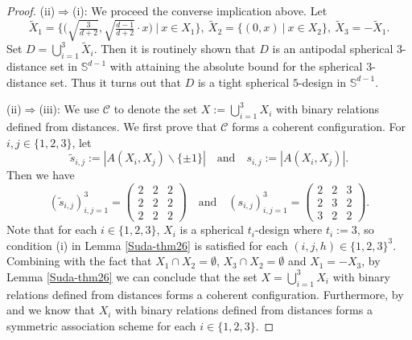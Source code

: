 \documentclass[11pt]{article}
\theoremstyle{definition}
\theoremstyle{remark}
\begin{document}
\begin{proof}
(ii)$\Rightarrow$(i): We proceed the converse implication above. 
Let 
\begin{equation*}
\widetilde{X}_1=\bigg\{\Big(\sqrt{\tfrac{3}{d+2}},\sqrt{\tfrac{d-1}{d+2}}\cdot x\Big)\ \Big|\  x\in X_1\bigg\},\  \widetilde{X}_2=\bigg\{(0,x) \ \Big|\  x\in X_2\bigg\},\ \widetilde{X}_3=-\widetilde{X}_1.
\end{equation*}
Set $D=\bigcup_{i=1}^3 \widetilde{X}_i$.
Then it is routinely shown that $D$ is an antipodal spherical $3$-distance set in $\mathbb{S}^{d-1}$ with attaining the absolute bound for the spherical $3$-distance set. 
Thus it turns out that $D$ is a tight spherical $5$-design in $\mathbb{S}^{d-1}$. 


(ii)$\Rightarrow$(iii): We use $\mathcal{C}$ to denote the set $X:=\bigcup_{i=1}^3 X_i$ with binary relations defined from distances. We first prove that $\mathcal{C}$ forms a coherent configuration. 
For $i,j\in\{1,2,3\}$, let 
\begin{equation*}
\widetilde{s}_{i,j}:=|A(X_i,X_j)\backslash\{\pm 1\}|	\quad\text{and}\quad {s}_{i,j}:=|A(X_i,X_j)|.
\end{equation*}
Then we have
\begin{equation*}
(\widetilde{s}_{i,j})_{i,j=1}^3=\begin{pmatrix} 
2 & 2 & 2 \\ 
2 & 2 & 2 \\ 
2 & 2 & 2 
\end{pmatrix}\quad\text{and}\quad ({s}_{i,j})_{i,j=1}^3=\begin{pmatrix} 
2 & 2 & 3 \\ 
2 & 3 & 2 \\ 
3 & 2 & 2 
\end{pmatrix}.
\end{equation*}
Note that for each $i\in\{1,2,3\}$, $X_i$ is a spherical $t_i$-design where $t_i:=3$, so condition (i) in Lemma \ref{Suda-thm26} is satisfied for each $(i,j,h) \in\{1,2,3\}^3$. Combining with the fact that $X_1\cap X_2=\emptyset$, $X_3\cap X_2=\emptyset$ and $X_1=-X_3$, by Lemma \ref{Suda-thm26} we can conclude that the set $X=\bigcup_{i=1}^3 X_i$ with binary relations defined from distances forms a coherent configuration.  
Furthermore, by \cite[Theorem 7.4]{DGS77} and \cite{BB09a} we know that $X_i$ with binary relations defined from distances forms a symmetric association scheme for each $i\in\{1,2,3\}$.


\end{proof}
\end{document}
